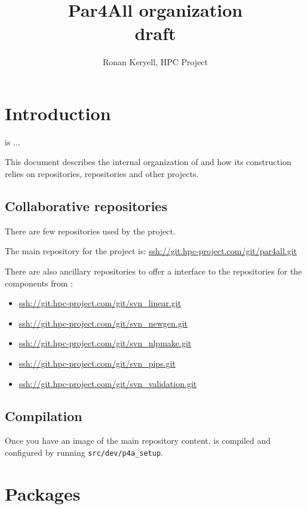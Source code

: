 \documentclass[a4paper]{article}
\begin{document}
\title{Par4All organization\\
  draft
}

\author{Ronan Keryell, HPC Project}

\maketitle

\section{Introduction}
\label{sec:introduction}

\Apfa is ...

This document describes the internal organization of \Apfa and how its
construction relies on \Agit repositories, \Asvn repositories and other
projects.


\subsection{Collaborative repositories}
\label{sec:coll-repos}

There are few \Agit repositories used by the project.

The main repository for the project is:
\url{ssh://git.hpc-project.com/git/par4all.git}

There are also ancillary \Agit repositories to offer a \Agit interface to
the \Asvn repositories for the \Apips components from \Acri:
\begin{itemize}
\item \url{ssh://git.hpc-project.com/git/svn_linear.git}
\item \url{ssh://git.hpc-project.com/git/svn_newgen.git}
\item \url{ssh://git.hpc-project.com/git/svn_nlpmake.git}
\item \url{ssh://git.hpc-project.com/git/svn_pips.git}
\item \url{ssh://git.hpc-project.com/git/svn_validation.git}
\end{itemize}


\subsection{Compilation}
\label{sec:compilation}

Once you have an image of the main \Agit repository content, \Apfa is
compiled and configured by running \verb|src/dev/p4a_setup|.


\section{Packages}
\label{sec:packages}
\end{document}
